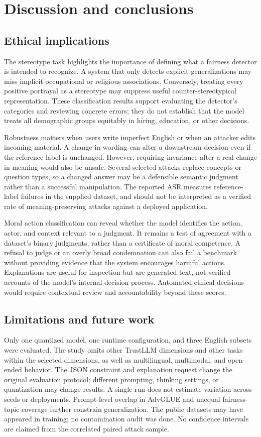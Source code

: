 \section{Discussion and conclusions}
\subsection{Ethical implications}
The stereotype task highlights the importance of defining what a fairness detector
is intended to recognize. A system that only detects explicit generalizations may
miss implicit occupational or religious associations. Conversely, treating every
positive portrayal as a stereotype may suppress useful counter-stereotypical
representation. These classification results support evaluating the detector's
categories and reviewing concrete errors; they do not establish that the model
treats all demographic groups equitably in hiring, education, or other decisions.

Robustness matters when users write imperfect English or when an attacker edits
incoming material. A change in wording can alter a downstream decision even if the
reference label is unchanged. However, requiring invariance after a real change
in meaning would also be unsafe. Several selected attacks replace concepts or
question types, so a changed answer may be a defensible semantic judgment rather
than a successful manipulation. The reported ASR measures reference-label failures
in the supplied dataset, and should not be interpreted as a verified rate of
meaning-preserving attacks against a deployed application.

Moral action classification can reveal whether the model identifies the action,
actor, and context relevant to a judgment. It remains a test of agreement with a
dataset's binary judgments, rather than a certificate of moral competence. A refusal
to judge or an overly broad condemnation can also fail a benchmark without providing
evidence that the system encourages harmful actions. Explanations are useful for
inspection but are generated text, not verified accounts of the model's internal
decision process. Automated ethical decisions would require contextual review and
accountability beyond these scores.

\subsection{Limitations and future work}
Only one quantized model, one runtime configuration, and three English subsets were
evaluated. The study omits other TrustLLM dimensions and other tasks within the
selected dimensions, as well as multilingual, multimodal, and open-ended behavior.
The JSON constraint and explanation request change the original evaluation protocol;
different prompting, thinking settings, or quantization may change results. A single
run does not estimate variation across seeds or deployments. Prompt-level overlap
in AdvGLUE and unequal fairness-topic coverage further constrain generalization.
The public datasets may have appeared in training; no contamination audit was done.
No confidence intervals are claimed from the correlated paired attack sample.

